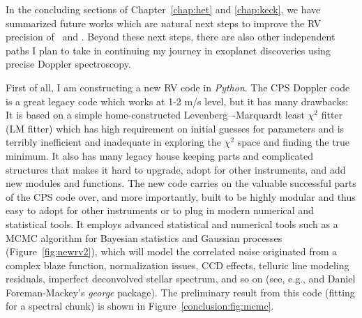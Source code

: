 In the concluding sections of Chapter~\ref{chap:het} and
\ref{chap:keck}, we have summarized future works which are natural
next steps to improve the RV precision of \het\ and \keck. Beyond
these next steps, there are also other independent paths I plan to
take in continuing my journey in exoplanet discoveries using precise
Doppler spectroscopy.

First of all, I am constructing a new RV code in {\it Python}. The CPS
Doppler code is a great legacy code which works at 1-2 m/s level, but
it has many drawbacks: It is based on a simple home-constructed
Levenberg–-Marquardt least $\chi^2$ fitter (LM fitter) which has high
requirement on initial guesses for parameters and is terribly
inefficient and inadequate in exploring the $\chi^2$ space and finding
the true minimum. It also has many legacy house keeping parts and
complicated structures that makes it hard to upgrade, adopt for other
instruments, and add new modules and functions. The new code carries
on the valuable successful parts of the CPS code over, and more
importantly, built to be highly modular and thus easy to adopt for
other instruments or to plug in modern numerical and statistical
tools. It employs advanced statistical and numerical tools such as a
MCMC algorithm for Bayesian statistics and Gaussian processes
(Figure~\ref{fig:newrv2}), which will model the correlated noise
originated from a complex blaze function, normalization issues, CCD
effects, telluric line modeling residuals, imperfect deconvolved
stellar spectrum, and so on (see, e.g., \citealt{starfish} and Daniel
Foreman-Mackey's {\it george} package). The preliminary result from
this code (fitting for a spectral chunk) is shown in
Figure~\ref{conclusion:fig:mcmc}.


